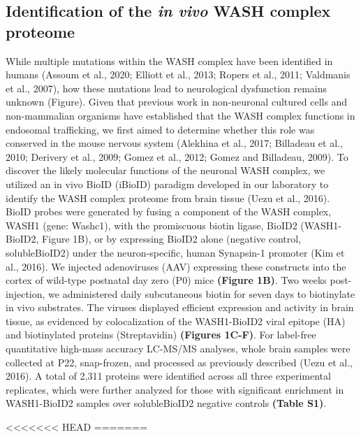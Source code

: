 
\subsection{Identification of the \textit{in vivo} WASH complex proteome}

While multiple mutations within the WASH complex have been identified in humans 
(Assoum et al., 2020; Elliott et al., 2013; Ropers et al., 2011; 
Valdmanis et al., 2007), how these mutations lead to neurological
dysfunction remains unknown (Figure). Given that previous work in
non-neuronal cultured cells and non-mammalian organisms have established that
the WASH complex functions in endosomal trafficking, we first aimed to determine
whether this role was conserved in the mouse nervous system (Alekhina et al.,
2017; Billadeau et al., 2010; Derivery et al., 2009; Gomez et al., 2012; Gomez
and Billadeau, 2009). To discover the likely molecular functions of the neuronal
WASH complex, we utilized an in vivo BioID (iBioID) paradigm developed in our
laboratory to identify the WASH complex proteome from brain tissue (Uezu et al.,
2016). BioID probes were generated by fusing a component of the WASH complex,
WASH1 (gene: Washc1), with the promiscuous biotin ligase, BioID2 (WASH1-BioID2,
Figure 1B), or by expressing BioID2 alone (negative control, solubleBioID2)
under the neuron-specific, human Synapsin-1 promoter (Kim et al., 2016). We
injected adenoviruses (AAV) expressing these constructs into the cortex of
wild-type postnatal day zero (P0) mice \textbf{(Figure 1B)}. Two weeks post-injection, we
administered daily subcutaneous biotin for seven days to biotinylate in vivo
substrates. The viruses displayed efficient expression and activity in brain
tissue, as evidenced by colocalization of the WASH1-BioID2 viral epitope (HA)
and biotinylated proteins (Streptavidin) \textbf{(Figures 1C-F)}. For label-free
quantitative high-mass accuracy LC-MS/MS analyses, whole brain samples were
collected at P22, snap-frozen, and processed as previously described (Uezu et
al., 2016). A total of 2,311 proteins were identified across all three
experimental replicates, which were further analyzed for those with significant
enrichment in WASH1-BioID2 samples over solubleBioID2 negative controls 
\textbf{(Table S1)}. 

<<<<<<< HEAD
=======

